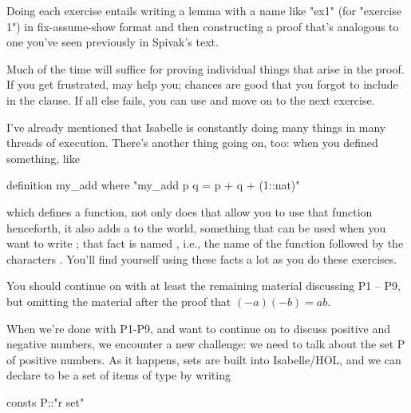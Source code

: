 Doing each exercise entails writing a lemma with a name like "ex1" (for "exercise 1") in fix-assume-show format and then 
constructing a proof that's analogous to one you've seen previously in Spivak's text. 

Much of the time  will suffice for proving individual things that arise in the proof. If you get frustrated,  may help you; chances are good that you forgot to include  in the  clause. If all else fails, you can use  and move on to the next exercise. 

I've already mentioned that Isabelle is constantly doing many things in many threads of execution. There's another thing going on, too: when you defined something, like
\begin{IS}
    definition my_add where "my_add p q = p + q + (1::nat)"
\end{IS}
which defines a  function, not only does that allow you to use that function henceforth, it also adds a  to the world, something that can be used when you want to write ; that fact is named , i.e., the name of the function followed by the characters . You'll find yourself using these facts a lot as you do these exercises. 

You should continue on with at least the remaining material discussing P1 -- P9, but omitting the material after the proof that $(-a)(-b) = ab$. 


When we're done with P1-P9, and want to continue on to discuss positive and negative numbers, we encounter a new challenge: we need to talk about the set P of positive numbers. As it happens, sets are built into Isabelle/HOL, and we can declare  to be a set of items of type  by writing 
\begin{IS}
consts
P::"r set"
\end{IS}

